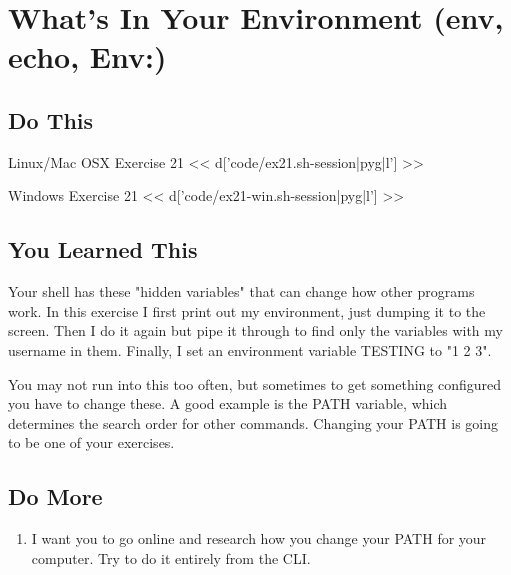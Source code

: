 \chapter{What's In Your Environment (env, echo, Env:)}

\section{Do This}

\begin{code}{Linux/Mac OSX Exercise 21}
<< d['code/ex21.sh-session|pyg|l'] >>
\end{code}

\begin{code}{Windows Exercise 21}
<< d['code/ex21-win.sh-session|pyg|l'] >>
\end{code}

\section{You Learned This}

Your shell has these "hidden variables" that can change how other programs work.
In this exercise I first print out my environment, just dumping it to the screen.
Then I do it again but pipe it through  to find only the variables
with my username in them.  Finally, I set an environment variable TESTING to "1 2 3".

You may not run into this too often, but sometimes to get something configured
you have to change these.  A good example is the PATH variable, which determines
the search order for other commands.  Changing your PATH is going to be one
of your exercises.


\section{Do More}

\begin{enumerate}
\item I want you to go online and research how you change your PATH for your computer.  Try to do it entirely from the CLI.
\end{enumerate}

